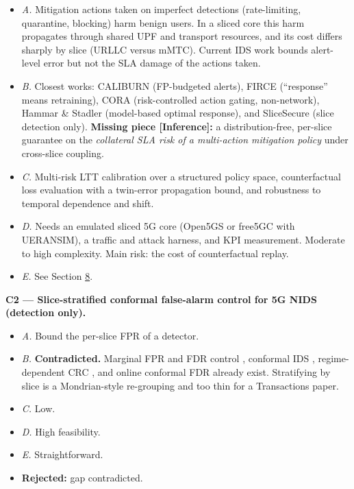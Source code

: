 \begin{itemize}
\tightlist
\item
  \emph{A.} Mitigation actions taken on imperfect detections
  (rate-limiting, quarantine, blocking) harm benign users. In a sliced
  core this harm propagates through shared UPF and transport resources,
  and its cost differs sharply by slice (URLLC versus mMTC). Current IDS
  work bounds alert-level error but not the SLA damage of the actions
  taken.
\item
  \emph{B.} Closest works: CALIBURN \citep{youssef2026caliburn}
  (FP-budgeted alerts), FIRCE \citep{barrett2026firce} (``response''
  means retraining), CORA \citep{cora2026} (risk-controlled action
  gating, non-network), Hammar \& Stadler
  \citep{hammar2022optimalstopping} (model-based optimal response), and
  SliceSecure \citep{khan2023slicesecure} (slice detection only).
  \textbf{Missing piece {[}Inference{]}:} a distribution-free, per-slice
  guarantee on the \emph{collateral SLA risk of a multi-action
  mitigation policy} under cross-slice coupling.
\item
  \emph{C.} Multi-risk LTT calibration over a structured policy space,
  counterfactual loss evaluation with a twin-error propagation bound,
  and robustness to temporal dependence and shift.
\item
  \emph{D.} Needs an emulated sliced 5G core (Open5GS or free5GC with
  UERANSIM), a traffic and attack harness, and KPI measurement. Moderate
  to high complexity. Main risk: the cost of counterfactual replay.
\item
  \emph{E.} See Section \protect\hyperlink{sec:rec}{8}.
\end{itemize}

\textbf{C2 --- Slice-stratified conformal false-alarm control for 5G
NIDS (detection only).}

\begin{itemize}
\tightlist
\item
  \emph{A.} Bound the per-slice FPR of a detector.
\item
  \emph{B.} \textbf{Contradicted.} Marginal FPR and FDR control
  \citep{bates2023outliers}, conformal IDS
  \citep{confid2026, barbero2022transcendent, barrett2026firce},
  regime-dependent CRC \citep{youssef2026caliburn}, and online conformal
  FDR \citep{farzaneh2025ccoad} already exist. Stratifying by slice is a
  Mondrian-style re-grouping and too thin for a Transactions paper.
\item
  \emph{C.} Low.
\item
  \emph{D.} High feasibility.
\item
  \emph{E.} Straightforward.
\item
  \textbf{Rejected:} gap contradicted.
\end{itemize}

